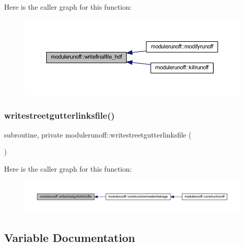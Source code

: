 Here is the caller graph for this function\+:
\nopagebreak
\begin{figure}[H]
\begin{center}
\leavevmode
\includegraphics[width=350pt]{namespacemodulerunoff_af0a5f9cb46a0d94efdb301f1b582b7c4_icgraph}
\end{center}
\end{figure}
\mbox{\label{namespacemodulerunoff_ab6d245038f3fab90baee9dcfb7ddc30e}} 
\subsubsection{\texorpdfstring{writestreetgutterlinksfile()}{writestreetgutterlinksfile()}}
{\footnotesize\ttfamily subroutine, private modulerunoff\+::writestreetgutterlinksfile (\begin{DoxyParamCaption}{ }\end{DoxyParamCaption})\hspace{0.3cm}{\ttfamily [private]}}

Here is the caller graph for this function\+:
\nopagebreak
\begin{figure}[H]
\begin{center}
\leavevmode
\includegraphics[width=350pt]{namespacemodulerunoff_ab6d245038f3fab90baee9dcfb7ddc30e_icgraph}
\end{center}
\end{figure}


\subsection{Variable Documentation}
\mbox{\label{namespacemodulerunoff_aba178d18c17a2ba6f92129edba6fa3a2}} 
